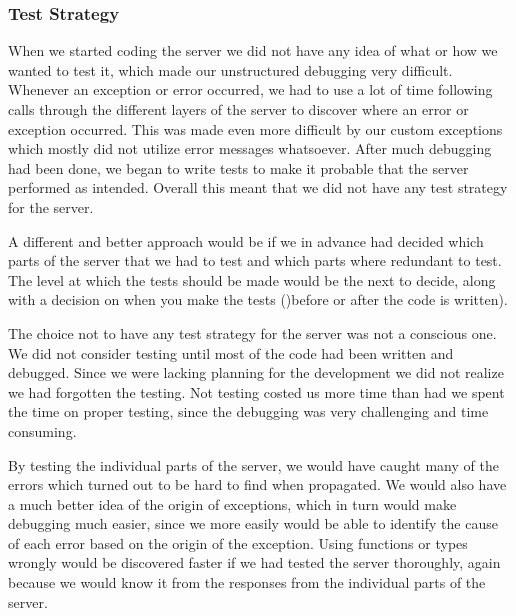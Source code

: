 \subsubsection{Test Strategy}
When we started coding the server we did not have any idea of what or how we wanted to test it, which made our unstructured debugging very difficult.
Whenever an exception or error occurred, we had to use a lot of time following calls through the different layers of the server to discover where an error or exception occurred.
This was made even more difficult by our custom exceptions which mostly did not utilize error messages whatsoever.
After much debugging had been done, we began to write tests to make it probable that the server performed as intended.
Overall this meant that we did not have any test strategy for the server.

A different and better approach would be if we in advance had decided which parts of the server that we had to test and which parts where redundant to test.
The level at which the tests should be made would be the next to decide, along with a decision on when you make the tests ()before or after the code is written).

The choice not to have any test strategy for the server was not a conscious one.
We did not consider testing until most of the code had been written and debugged.
Since we were lacking planning for the development we did not realize we had forgotten the testing.
Not testing costed us more time than had we spent the time on proper testing, since the debugging was very challenging and time consuming.

By testing the individual parts of the server, we would have caught many of the errors which turned out to be hard to find when propagated.
We would also have a much better idea of the origin of exceptions, which in turn would make debugging much easier, since we more easily would be able to identify the cause of each error based on the origin of the exception.
Using functions or types wrongly would be discovered faster if we had tested the server thoroughly, again because we would know it from the responses from the individual parts of the server.